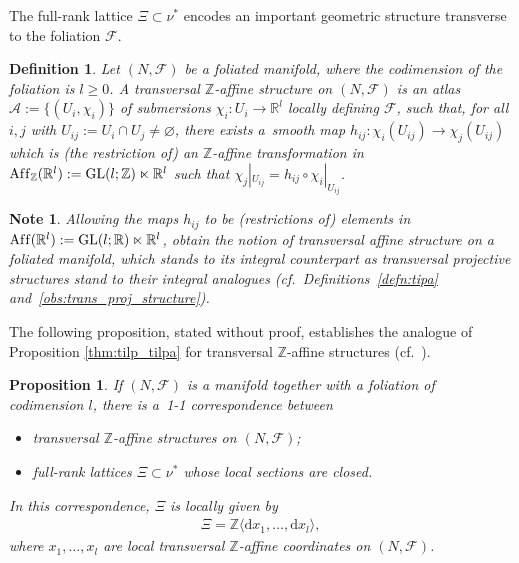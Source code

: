 \documentclass[10pt,a4paper]{amsart}
\numberwithin{equation}{section}
\newtheorem{Proposition}[Theorem]{Proposition}
\newtheorem{Definition}[Theorem]{Definition}
\newtheorem{Note}[Theorem]{Note}
\newcommand{\de}{\mathrm{d}} %
\newcommand{\RR}{\mathbb{R}}
\newcommand{\ZZ}{\mathbb{Z}}
\begin{document}
The full-rank lattice $\Xi \subset \nu^*$ encodes an important geometric structure transverse to the foliation $\mathcal{F}$.

\begin{Definition}\label{defn:tias}
Let $(N,\mathcal{F})$ be a foliated manifold, where the codimension of the foliation is $l \geq 0$. A {\it transversal $\ZZ$-affine structure} on $(N,\mathcal{F})$ is an atlas $\mathcal{A} :=\{(U_i, \chi_i)\}$ of submersions $\chi_i \colon U_i \to \RR^l$ locally def\/ining $\mathcal{F}$, such that, for all $i,j$ with $U_{ij} := U_i \cap U_j \neq \varnothing$, there exists a~smooth map $h_{ij}\colon \chi_i(U_{ij}) \to \chi_j(U_{ij})$ which is (the restriction of) an $\ZZ$-af\/f\/ine transformation in $\operatorname{Af\/f}_{\ZZ}(\RR^l) := \mathrm{GL}(l;\ZZ) \ltimes \RR^l$ such that $\chi_j|_{U_{ij}} = h_{ij} \circ \chi_i|_{U_{ij}}$.
\end{Definition}

\begin{Note}\label{obs:trans_aff_structure}
Allowing the maps $h_{ij}$ to be (restrictions of) elements in $\operatorname{Af\/f}(\RR^l) := \mathrm{GL}(l;\RR) \ltimes \RR^l$, obtain the notion of {\it transversal affine structure} on a foliated manifold, which stands to its integral counterpart as transversal projective structures stand to their integral analogues (cf.\ Def\/initions~\ref{defn:tipa} and~\ref{obs:trans_proj_structure}).
\end{Note}

The following proposition, stated without proof, establishes the analogue of Proposition \ref{thm:tilp_tilpa} for transversal $\ZZ$-af\/f\/ine structures (cf.\ \cite[Proposition~3.2.4]{PMCT2}).

\begin{Proposition}\label{prop:correspondence}
If $(N,\mathcal{F})$ is a manifold together with a foliation of codimension $l$, there is a~{\rm 1-1} correspondence between
 \begin{itemize}\itemsep=0pt
 \item transversal $\ZZ$-affine structures on $(N,\mathcal{F})$;
 \item full-rank lattices $\Xi \subset \nu^*$ whose local sections are closed.
 \end{itemize}
In this correspondence, $\Xi$ is locally given by
 \begin{gather*}
 \Xi = \ZZ \langle \de x_1,\ldots , \de x_l \rangle,
 \end{gather*}
where $x_1,\ldots,x_l$ are local transversal $\ZZ$-affine coordinates on $(N,\mathcal{F})$.
\end{Proposition}
\end{document}
